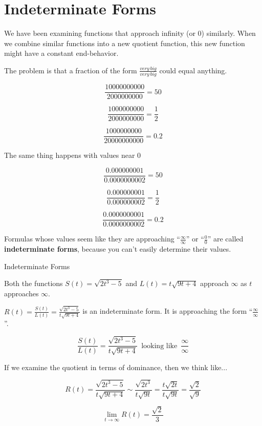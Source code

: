 \documentclass{ximera}
\begin{document}
\section*{Indeterminate Forms}


We have been examining functions that approach infinity (or $0$) similarly. When we combine similar functions into a new quotient function, this new function might have a constant end-behavior. 

The problem is that a fraction of the form $\frac{very \, big}{very \, big}$ could equal anything.



\[  \frac{10000000000}{2000000000} = 50      \]

\[  \frac{1000000000}{2000000000} = \frac{1}{2}      \]

\[  \frac{1000000000}{20000000000} = 0.2      \]





The same thing happens with values near $0$


\[  \frac{0.000000001}{0.0000000002} = 50      \]

\[  \frac{0.000000001}{0.000000002} = \frac{1}{2}      \]

\[  \frac{0.0000000001}{0.0000000002} = 0.2      \]





Formulas whose values seem like they are approaching ``$\frac{\infty}{\infty}$'' or ``$\frac{0}{0}$'' are called \textbf{indeterminate forms}, because you can't easily determine their values.





\begin{example}  Indeterminate Forms

Both the functions $S(t) = \sqrt{2t^3 - 5}$ and $L(t) = t\sqrt{9t+4}$ approach $\infty$ as $t$ approaches $\infty$. 



$R(t) = \frac{S(t)}{L(t)} = \frac{\sqrt{2t^3 - 5}}{t\sqrt{9t+4}}$ is an indeterminate form. It is approaching the form ``$\frac{\infty}{\infty}$''. 




\[
\frac{S(t)}{L(t)} = \frac{\sqrt{2t^3 - 5}}{t\sqrt{9t+4}} \, \text{ looking like } \, \frac{\infty}{\infty}
\]





If we examine the quotient in terms of dominance, then we think like...

\[
R(t) =  \frac{\sqrt{2t^3 - 5}}{t \sqrt{9t+4}} \sim \frac{\sqrt{2t^3}}{t \sqrt{9t}} = \frac{t \sqrt{2t}}{t \sqrt{9t}} = \frac{\sqrt{2}}{\sqrt{9}}
\]



\[
\lim\limits_{t \to \infty} R(t) = \frac{\sqrt{2}}{3}
\]

\end{example}
\end{document}

